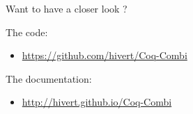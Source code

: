 \documentclass[compress,11pt]{beamer}
\begin{document}
\begin{frame}{Want to have a closer look ?}
  \Large

  The code:\\
  \begin{itemize}
  \item \url{https://github.com/hivert/Coq-Combi}
  \end{itemize}
  \bigskip  \bigskip

  The documentation:\\
  \begin{itemize}
  \item \url{http://hivert.github.io/Coq-Combi}
  \end{itemize}
\end{frame}
\end{document}
